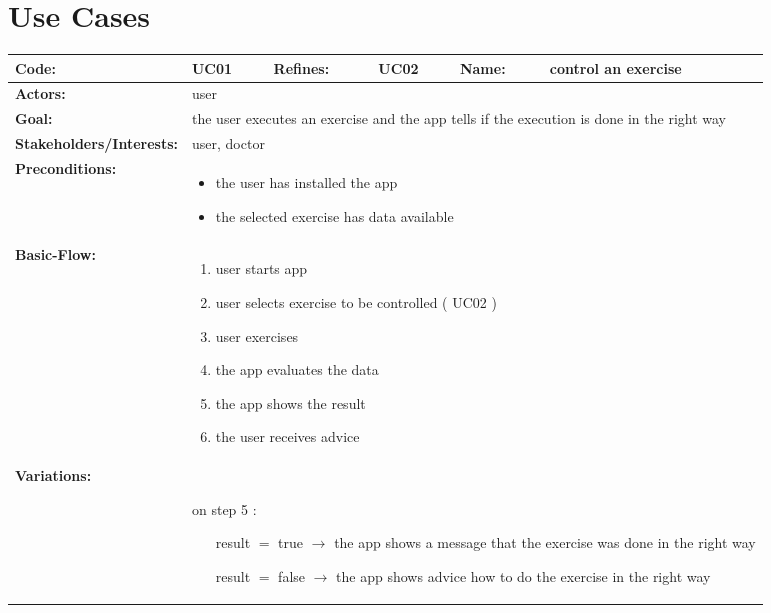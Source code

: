 \section{Use Cases}
\begin{table}[H]
	\begin{tabular}{|l|l|l|l|l|l|} \hline
		\textbf{Code:} & UC01 & \textbf{Refines:} & UC02 & \textbf{Name:} & control an exercise \\ \hline
		\textbf{Actors:} & \multicolumn{5}{l|}{user} \\ \hline
		\textbf{Goal:} & \multicolumn{5}{l|}{the user executes an exercise and the app tells if the execution is done in the right way} \\ \hline
		\textbf{Stakeholders/Interests:} & \multicolumn{5}{l|}{user, doctor} \\ \hline
		\textbf{Preconditions:} & \multicolumn{5}{l|}{\parbox{0.75\textwidth}{
			\begin{itemize}[itemsep=-5]
				\item the user has installed the app
				\item the selected exercise has data available
			\end{itemize}
		}} \\ \hline
		\textbf{Basic-Flow:} & \multicolumn{5}{l|}{\parbox{0.75\textwidth}{
			\begin{enumerate}[itemsep=-5]
				\item user starts app
				\item user selects exercise to be controlled ( UC02 )
				\item user exercises
				\item the app evaluates the data
				\item the app shows the result
				\item the user receives advice
			\end{enumerate}
		}} \\ \hline
		\textbf{Variations:} & \multicolumn{5}{l|}{\parbox{0.75\textwidth}{
			$ $\\on step 5 :
			\begin{itemize}[leftmargin=2.5cm,itemsep=-5]
				\item[result $=$ true ] $\rightarrow$ the app shows a message that the exercise was done in the right way 
				\item[result $=$ false] $\rightarrow$ the app shows advice how to do the exercise in the right way
			\end{itemize}
		}} \\ \hline

\end{tabular}
\end{table}
